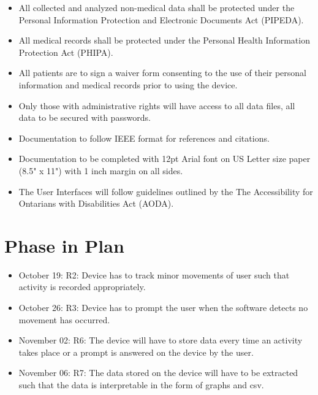 \documentclass[12pt]{article}
\begin{document}
\begin{itemize}
	\item All collected and analyzed non-medical data shall be protected under the Personal Information Protection and Electronic Documents Act (PIPEDA).
	\item All medical records shall be protected under the Personal Health Information Protection Act (PHIPA).
	\item All patients are to sign a waiver form consenting to the use of their personal information and medical records prior to using the device.
	\item Only those with administrative rights will have access to all data files, all data to be secured with passwords.
	\item Documentation to follow IEEE format for references and citations.
	\item Documentation to be completed with 12pt Arial font on US Letter size paper (8.5" x 11") with 1 inch margin on all sides.
	\item The User Interfaces will follow guidelines outlined by the The Accessibility for Ontarians with Disabilities Act (AODA).
\end{itemize}

\section{Phase in Plan}
\label{Phase_In}

\begin{itemize}
\item October 19: R2: Device has to track minor movements of user such that activity is recorded appropriately.\\
\item October 26: R3: Device has to prompt the user when the software detects no movement has occurred.\\
\item November 02:  R6: The device will have to store data every time an activity takes place or a prompt is answered on the device by the user.\\
\item November 06:  R7: The data stored on the device will have to be extracted such that the data is interpretable in the form of graphs and csv.\\
\end{itemize}
\newpage
\end{document}

